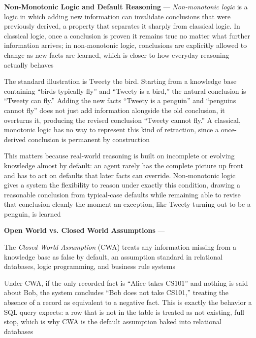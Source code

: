 \textbf{Non-Monotonic Logic and Default Reasoning} --- \emph{Non-monotonic
logic} is a logic in which adding new information can invalidate
conclusions that were previously derived, a property that separates it
sharply from classical logic. In classical logic, once a conclusion is
proven it remains true no matter what further information arrives; in
non-monotonic logic, conclusions are explicitly allowed to change as new
facts are learned, which is closer to how everyday reasoning actually
behaves

The standard illustration is Tweety the bird. Starting from a knowledge
base containing ``birds typically fly'' and ``Tweety is a bird,'' the
natural conclusion is ``Tweety can fly.'' Adding the new facts ``Tweety is
a penguin'' and ``penguins cannot fly'' does not just add information
alongside the old conclusion, it overturns it, producing the revised
conclusion ``Tweety cannot fly.'' A classical, monotonic logic has no way
to represent this kind of retraction, since a once-derived conclusion is
permanent by construction

This matters because real-world reasoning is built on incomplete or
evolving knowledge almost by default: an agent rarely has the complete
picture up front and has to act on defaults that later facts can override.
Non-monotonic logic gives a system the flexibility to reason under exactly
this condition, drawing a reasonable conclusion from typical-case defaults
while remaining able to revise that conclusion cleanly the moment an
exception, like Tweety turning out to be a penguin, is learned

\textbf{Open World vs. Closed World Assumptions} --- \begin{definition}
  The \emph{Closed World Assumption} (CWA) treats any information missing
  from a knowledge base as false by default, an assumption standard in
  relational databases, logic programming, and business rule systems
\end{definition}
Under CWA, if the only recorded fact is ``Alice takes CS101'' and nothing
is said about Bob, the system concludes ``Bob does not take CS101,''
treating the absence of a record as equivalent to a negative fact. This is
exactly the behavior a SQL query expects: a row that is not in the table is
treated as not existing, full stop, which is why CWA is the default
assumption baked into relational databases

